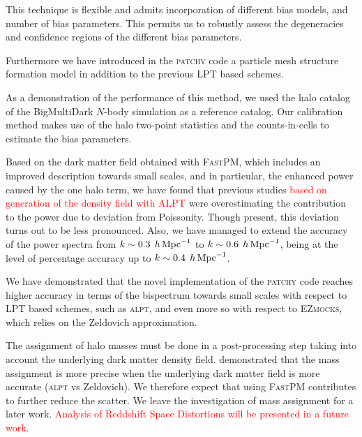 \documentclass[english,usenatbib]{mn2e}
\newcommand{\tod}[1]{{\textcolor{red}{ #1}}}
\newcommand{\hperm}{\,h\,{\rm Mpc}^{-1}}
\begin{document}
This technique is flexible and admits incorporation of different bias models, and number of bias parameters. This permits us to robustly assess the degeneracies and confidence regions of the different bias parameters.

Furthermore we have introduced in the \textsc{patchy} code a particle mesh structure formation model \citep[the \textsc{FastPM} code, see][]{fastpm} in addition to the previous LPT based schemes.


As a demonstration of the performance of this method, we used the halo catalog of the BigMultiDark $N$-body simulation as a reference catalog. Our calibration method makes use of the halo two-point statistics and the counts-in-cells to estimate the bias parameters. 

Based on the dark matter field obtained with \textsc{FastPM}, which includes an improved description towards small scales, and in particular, the enhanced power caused by the one halo term, we have found that previous studies \tod{based on generation of the density field with \textsc{ALPT}} were overestimating the contribution to the power due to deviation from Poissonity. Though present, this deviation turns out to be less pronounced. Also, we have managed to extend the accuracy of the power spectra from $k\sim 0.3\; \hperm$ to $k\sim 0.6 \;\hperm$, being at the level of percentage accuracy up to $k\sim 0.4\; \hperm$.

We have demonstrated that the novel implementation of the \textsc{patchy} code reaches higher accuracy in terms of the bispectrum towards small scales with respect to  LPT based schemes, such as \textsc{alpt}, and even more so with respect to \textsc{EZmocks}, which relies on the Zeldovich approximation. 

The assignment of halo masses must be done in a post-processing step taking into account the underlying dark matter density field. \citet{zhao2015} demonstrated that the mass assignment is more precise when the underlying dark matter field is more accurate (\textsc{alpt} vs Zeldovich). We therefore expect that using \textsc{FastPM} contributes to further reduce the scatter. We leave the investigation of mass assignment for a later work. \tod{Analysis of Reddshift Space Distortions will be presented in a future work.}

\end{document}
